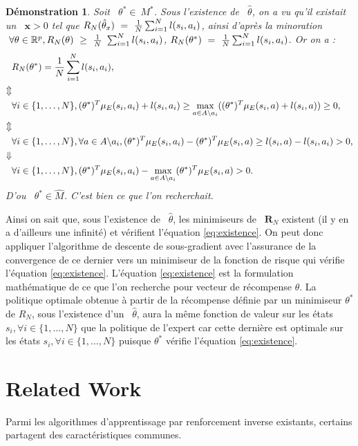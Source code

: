 \documentclass[publibook-draft]{CAp2012}
\newtheorem{preuve}{Démonstration}
\newcommand{\R}{\mathbf{R}}
\newcommand{\x}{\mathbf{x}}
\begin{document}
{\begin{preuve}
Soit ~$\theta^*\in\ M^*$. Sous l'existence de ~$\hat{\theta}$, on a vu qu'il existait un ~$\x>0$ tel que $R_N(\hat{\theta}_x)~=~{1\over N} \sum_{i=1}^N l(s_i,a_i)$, ainsi d'après la minoration $~\forall \theta\in\mathbb{R}^p, R_N(\theta)~\geq~{1\over N}~\sum_{i=1}^Nl(s_i,a_i)$, $R_N(\theta^*)~=~{1\over N} \sum_{i=1}^N l(s_i,a_i)$.
Or on a :
\begin{align}
&R_N(\theta^*)={1\over N} \sum_{i=1}^N l(s_i,a_i),
\\
\nonumber\Updownarrow
\\
&\forall i\in\{1,\dots,N\}, (\theta^*)^T\mu_E(s_i,a_i) + l(s_i,a_i)\geq\max_{a \in A \backslash a_i}((\theta^*)^T\mu_E(s_i,a)+l(s_i,a))\geq0,
\\
\nonumber\Updownarrow
\\
&\forall i\in\{1,\dots,N\},\forall a \in A \backslash a_i,  (\theta^*)^T\mu_E(s_i,a_i)-(\theta^*)^T\mu_E(s_i,a)\geq l(s_i,a)- l(s_i,a_i)>0,
\\
\nonumber\Downarrow
\\
&\forall i\in\{1,\dots,N\}, (\theta^*)^T\mu_E(s_i,a_i)-\max_{a \in A \backslash a_i}(\theta^*)^T\mu_E(s_i,a)>0.
\end{align}
D'ou ~$\theta^*\in \hat{M}$. C'est bien ce que l'on recherchait.
\end{preuve}
Ainsi on sait que, sous l'existence de ~$\hat{\theta}$, les minimiseurs de ~$\R_N$ existent (il y en a d'ailleurs une infinité) et vérifient l'équation \ref{eq:existence}.
On peut donc appliquer l'algorithme de descente de sous-gradient avec l'assurance de la convergence de ce dernier vers un minimiseur de la fonction de risque qui vérifie l'équation \ref{eq:existence}. L'équation \ref{eq:existence} est la formulation mathématique de ce que l'on recherche pour vecteur de récompense $\theta$. La politique optimale obtenue à partir de la récompense définie par un minimiseur $\theta^*$ de $R_N$, sous l'existence d'un ~$\hat{\theta}$, aura la même fonction de valeur sur les états $s_i,\forall i\in\{1,\dots,N\}$ que la politique de l'expert car cette dernière est optimale sur les états $s_i,\forall i\in\{1,\dots,N\}$ puisque $\theta^*$ vérifie l'équation \ref{eq:existence}.
\section{Related Work}
\label{biblio.sec}
Parmi les algorithmes d'apprentissage par renforcement inverse existants, certains partagent des caractéristiques communes.\\

}
\end{document}
